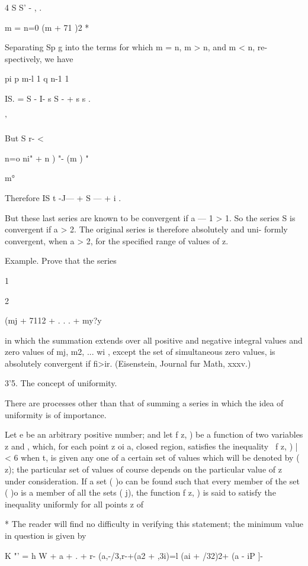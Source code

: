  4 S S' - , .

m = n=0 (m + 71 )2 *

Separating Sp g into the terms for which m = n, m > n, and m < n, re-
spectively, we have

pi p m-l 1 q n-1 1

IS. = S - I- s S - + s s .

'%

But S r- <



n=o ni" + n ) "- (m ) "



m°



Therefore IS t -J— + S — + i .

But these last series are known to be convergent if a — 1 > 1. So the
series S is convergent if a > 2. The original series is therefore
absolutely and uni- formly convergent, when a > 2, for the specified
range of values of z.

Example. Prove that the series

1

2



(mj + 7112 + . . . + my?y

in which the summation extends over all positive and negative integral
values and zero values of mj, m2, ... wi , except the set of
simultaneous zero values, is absolutely convergent if fi>ir.
(Eisenstein, Journal fur Math, xxxv.)

3'5. The concept of uniformity.

There are processes other than that of summing a series in which the
idea of uniformity is of importance.

Let e be an arbitrary positive number; and let f z, ) be a function of
two variables z and , which, for each point z oi a, closed region,
satisfies the inequality \ f z, ) | < 6 when t, is given any one of a
certain set of values which will be denoted by ( z); the particular
set of values of course depends on the particular value of z under
consideration. If a set ( )o can be found such that every member of
the set ( )o is a member of all the sets ( j), the function f z, ) is
said to satisfy the inequality uniformly for all points z of

* The reader will find no difficulty in verifying this statement; the
minimum value in question is given by

K "' = h W + a + . + r- (a,-/3,r-+(a2 + ,3i)=l (ai + /32)2+ (a - iP ]-



